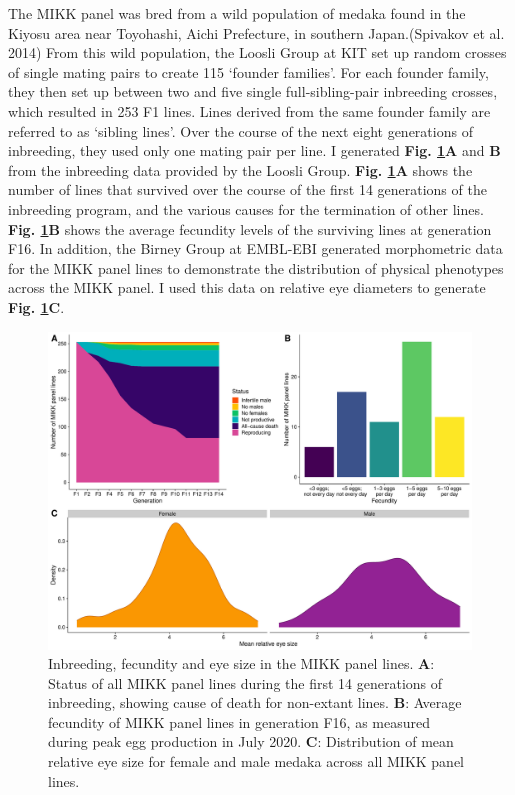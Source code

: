 \documentclass[
]{book}
\begin{document}
The MIKK panel was bred from a wild population of medaka found in the Kiyosu area near Toyohashi, Aichi Prefecture, in southern Japan.(Spivakov et al. 2014) From this wild population, the Loosli Group at KIT set up random crosses of single mating pairs to create 115 `founder families'. For each founder family, they then set up between two and five single full-sibling-pair inbreeding crosses, which resulted in 253 F1 lines. Lines derived from the same founder family are referred to as `sibling lines'. Over the course of the next eight generations of inbreeding, they used only one mating pair per line. I generated \textbf{Fig. \ref{fig:InbreedingFigure}A} and \textbf{B} from the inbreeding data provided by the Loosli Group. \textbf{Fig. \ref{fig:InbreedingFigure}A} shows the number of lines that survived over the course of the first 14 generations of the inbreeding program, and the various causes for the termination of other lines. \textbf{Fig. \ref{fig:InbreedingFigure}B} shows the average fecundity levels of the surviving lines at generation F16. In addition, the Birney Group at EMBL-EBI generated morphometric data for the MIKK panel lines to demonstrate the distribution of physical phenotypes across the MIKK panel. I used this data on relative eye diameters to generate \textbf{Fig. \ref{fig:InbreedingFigure}C}.



\begin{figure}
\includegraphics[width=1\linewidth]{figs/mikk_genome/20211213_final_figure} \caption{Inbreeding, fecundity and eye size in the MIKK panel lines. \textbf{A}: Status of all MIKK panel lines during the first 14 generations of inbreeding, showing cause of death for non-extant lines. \textbf{B}: Average fecundity of MIKK panel lines in generation F16, as measured during peak egg production in July 2020. \textbf{C}: Distribution of mean relative eye size for female and male medaka across all MIKK panel lines.}\label{fig:InbreedingFigure}
\end{figure}
\end{document}
